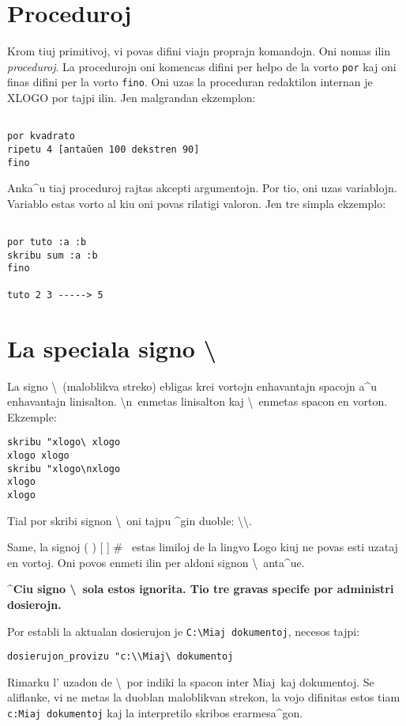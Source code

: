 \section{Proceduroj}
Krom tiuj primitivoj, vi povas difini viajn proprajn komandojn.  Oni
nomas ilin \textit{proceduroj}.  La procedurojn oni komencas difini
per helpo de la vorto \texttt{por} kaj oni finas difini per la vorto
\texttt{fino}.  Oni uzas la proceduran redaktilon internan je XLOGO
por tajpi ilin.  Jen malgrandan ekzemplon:
\begin{verbatim}

por kvadrato 
ripetu 4 [antaŭen 100 dekstren 90]
fino

\end{verbatim}

Anka^u tiaj proceduroj rajtas akcepti argumentojn.  Por tio, oni uzas
variablojn.  Variablo estas vorto al kiu oni povas rilatigi valoron.
Jen tre simpla ekzemplo:

\begin{verbatim}

por tuto :a :b
skribu sum :a :b
fino

tuto 2 3 -----> 5

\end{verbatim}

\section{La speciala signo  \og\textbackslash\fg}
La signo \og \textbackslash \fg \ (maloblikva streko) ebligas krei
vortojn enhavantajn spacojn a^u enhavantajn linisalton.  \og
\textbackslash n\fg \ enmetas linisalton kaj \og
\textbackslash\textvisiblespace\fg \ enmetas spacon en vorton.
Ekzemple:
\begin{verbatim}
skribu "xlogo\ xlogo
xlogo xlogo
skribu "xlogo\nxlogo
xlogo
xlogo
\end{verbatim}
Tial por skribi signon \og \textbackslash\fg \ oni tajpu ^gin duoble:
\og \textbackslash\textbackslash\fg.

Same, la signoj \og ( ) [ ] \# \fg\ estas limiloj de la lingvo Logo
kiuj ne povas esti uzataj en vortoj.  Oni povos enmeti ilin per aldoni
signon \og \textbackslash \fg\ anta^ue.

\textbf{^Ciu signo \og \textbackslash \fg \ sola estos ignorita.  Tio
  tre gravas specife por administri dosierojn.}

Por establi la aktualan dosierujon je \texttt{C:\textbackslash Miaj
  dokumentoj}, necesos tajpi:
\begin{verbatim}
dosierujon_provizu "c:\\Miaj\ dokumentoj
\end{verbatim}
Rimarku l' uzadon de \og \textbackslash\textvisiblespace \fg \ por
indiki la spacon inter \og Miaj\fg \ kaj \og dokumentoj\fg.  Se
aliflanke, vi ne metas la duoblan maloblikvan strekon, la vojo
difinitas estos tiam \texttt{c:Miaj dokumentoj} kaj la interpretilo
skribos erarmesa^gon.


